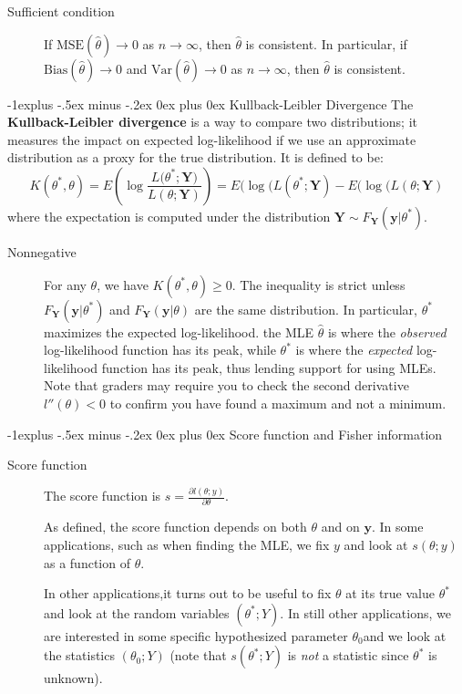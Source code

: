 \documentclass[10pt,landscape]{article}
\makeatletter
\newcommand{\var}{\textrm{Var}}
\newcommand{\MSE}{\textrm{MSE}}
\newcommand{\bias}{\textrm{Bias}}
\renewcommand\vec{\mathbf}
\renewcommand{\subsection}{\@startsection{subsection}{2}{0mm}%
                                {-1explus -.5ex minus -.2ex}%
                                {0ex plus 0ex}%
                                {\normalfont\small\bfseries}}
\makeatother
\begin{document}
\begin{multicols*}{3}
\begin{description}
\item[Sufficient condition] If $\MSE(\hat\theta)\to 0$ as $n\to\infty$, then $\hat\theta$ is consistent. In particular, if $\bias(\hat\theta)\to 0$ and $\var(\hat\theta)\to 0$ as $n\to\infty$, then $\hat\theta$ is consistent.
\end{description}
\subsection{Kullback-Leibler Divergence}
The \textbf{Kullback-Leibler  divergence} is a way to compare two distributions; it measures the impact on expected log-likelihood if we use an approximate distribution as a proxy for the true distribution. It is defined to be:
\[K(\theta^*,\theta)=E\left(\log\frac{L(\theta^*;\vec{Y)}}{L(\theta;\vec Y)}\right)=E(\log(L(\theta^*;\vec{Y})-E(\log(L(\theta;\vec{Y})\]
where the expectation is computed under the distribution $\vec{Y}\sim F_\vec{Y}(\vec{y}|\theta^*)$.

\begin{description}
\item[Nonnegative] For any $\theta$, we have $K(\theta^*,\theta)\geq 0$. The inequality is strict unless $F_\vec{Y}(\vec{y}|\theta^*)$ and $F_\vec{Y}(\vec{y}|\theta)$ are the same distribution. In particular, $\theta^*$ maximizes the expected log-likelihood. the MLE $\hat\theta$ is where the \textit{observed} log-likelihood function has its peak, while $\theta^*$ is where the \textit{expected} log-likelihood function has its peak, thus lending support for using MLEs. Note that graders may require you to check the second derivative $l''(\theta) < 0$ to confirm you have found a maximum and not a minimum.
\end{description}
\subsection{Score function and Fisher information}
\begin{description}
\item[Score function]
The score function is $s=\frac{\partial l(\theta;y)}{\partial\theta}$.

As defined, the score function depends on both $\theta$ and on $\vec y$. In some applications, such as when finding the MLE, we fix $y$ and look at $s(\theta;y)$ as a function of $\theta$.  

In other applications,it turns out to be useful to fix $\theta$ at its true value $\theta^*$ and look at the random variables $(\theta^*;Y)$. In still other applications, we are interested in some specific hypothesized parameter $\theta_0$and we look at the statistics $(\theta_0;Y)$ (note that $s(\theta^*;Y)$ is \textit{not} a statistic since $\theta^*$ is unknown).


\end{description}
\end{multicols*}
\end{document}
